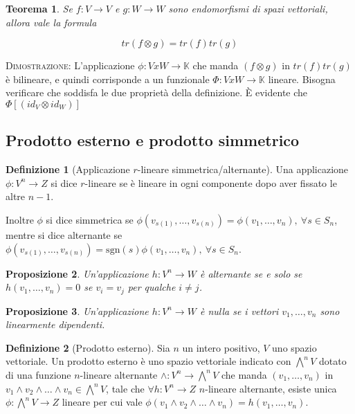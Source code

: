 \documentclass[11pt]{article}
\theoremstyle{plain}
\newtheorem{thm}{Teorema}[section]
\newtheorem{prop}[thm]{Proposizione}
\theoremstyle{definition}
\newtheorem{defn}{Definizione}[section]
\theoremstyle{remark}
\newcommand{\K}{\mathbb{K}}
\begin{document}
\begin{thm}
Se $f:V\to V$ e $g:W\to W$ sono endomorfismi di spazi vettoriali, allora vale la formula

\[tr(f\otimes g) = tr(f) tr(g)  \]

\end{thm}

\textsc{Dimostrazione:} L'applicazione $\phi: V x W \to \K$ che manda $(f\otimes g)$ in $tr(f) tr(g)$ è bilineare, e quindi corrisponde a un funzionale $\Phi: V x W \to \K$ lineare. Bisogna verificare che soddisfa le due proprietà della definizione.  È evidente che $\Phi[ (id_V \otimes id_W)  ]  $ 


\subsection{Prodotto esterno e prodotto simmetrico}

\begin{defn}[Applicazione $r$-lineare simmetrica/alternante]
 Una applicazione $\phi: V^n \to Z$ si dice $r$-lineare se è lineare in ogni componente dopo aver fissato le altre $n-1$.

 Inoltre $\phi$ si dice simmetrica se $\phi(v_{s(1)},\ldots,v_{s(n)})=\phi(v_1,\ldots,v_n),\ \forall s \in S_n$, mentre si dice 
 alternante se $\phi(v_{s(1)},\ldots,v_{s(n)})=\mathrm{sgn}(s)\phi(v_1,\ldots,v_n),\ \forall s \in S_n$.
 
\end{defn}

\begin{prop}
 Un'applicazione $h: V^n \to W$ è alternante se e solo se $h(v_1,\ldots,v_n)=0$ se $v_i=v_j$ per qualche $i\neq j$.
 \end{prop}

 \begin{prop}
  Un'applicazione $h: V^n \to W$ è nulla se i vettori $v_1,\ldots,v_n$ sono linearmente dipendenti.
 \end{prop}

\begin{defn}[Prodotto esterno]
Sia $n$ un intero positivo, $V$ uno spazio vettoriale. Un prodotto esterno è uno spazio vettoriale indicato con $\bigwedge^n V$
dotato di una funzione $n$-lineare alternante $\wedge: V^n \to \bigwedge^n V$ che manda $(v_1,\ldots,v_n)$ in 
$v_1\wedge v_2\wedge\ldots\wedge v_n \in \bigwedge^n V$, tale che $\forall h: V^n \to Z$ $n$-lineare alternante, 
esiste unica $\phi: \bigwedge^n V \to Z $ lineare per cui vale $\phi(v_1\wedge v_2\wedge \ldots \wedge v_n)=h(v_1,\ldots,v_n)$.

\label{defn:prodotto esterno}
\end{defn}
\end{document}
